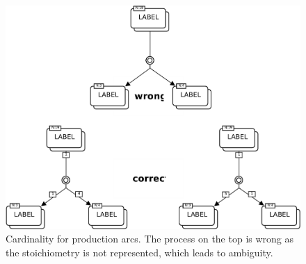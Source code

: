\begin{figure}[H]
  \centering
  \includegraphics[scale = 0.6]{images/build/stoich_ex1_example.pdf}
  \caption{Cardinality for production arcs.
  The process on the top is wrong as the stoichiometry is not represented, which leads to ambiguity.}
  \label{fig:prod-card}
\end{figure}

